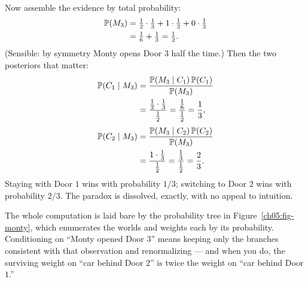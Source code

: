 Now assemble the evidence by total probability:
\begin{align*}
  \P(M_3) &= \tfrac12\cdot\tfrac13 + 1\cdot\tfrac13 + 0\cdot\tfrac13 \\
          &= \tfrac16 + \tfrac13 = \tfrac12.
\end{align*}
(Sensible: by symmetry Monty opens Door $3$ half the time.) Then the two posteriors that
matter:
\begin{align*}
  \P(C_1 \given M_3) &= \frac{\P(M_3\given C_1)\P(C_1)}{\P(M_3)} \\
  &= \frac{\tfrac12\cdot\tfrac13}{\tfrac12} = \frac{\tfrac16}{\tfrac12} = \frac13,
\end{align*}
\begin{align*}
  \P(C_2 \given M_3) &= \frac{\P(M_3\given C_2)\P(C_2)}{\P(M_3)} \\
  &= \frac{1\cdot\tfrac13}{\tfrac12} = \frac{\tfrac13}{\tfrac12} = \frac23.
\end{align*}
Staying with Door $1$ wins with probability $1/3$; switching to Door $2$ wins with
probability $2/3$. The paradox is dissolved, exactly, with no appeal to intuition.

The whole computation is laid bare by the probability tree in Figure~\ref{ch05:fig-monty},
which enumerates the worlds and weights each by its probability. Conditioning on
``Monty opened Door $3$'' means keeping only the branches consistent with that observation
and renormalizing --- and when you do, the surviving weight on ``car behind Door $2$'' is
twice the weight on ``car behind Door $1$.''

